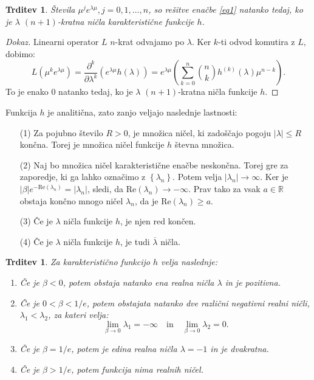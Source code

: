 \documentclass[12pt,a4paper]{amsart}
\theoremstyle{definition} %
\theoremstyle{plain} %
\newtheorem{trditev}[definicija]{Trditev}
\newcommand{\R}{\mathbb R}
\begin{document}
\begin{trditev}
    Števila $\mu^{j}e^{\lambda \mu}, j=0,1,\dots,n$, so rešitve enačbe \eqref{eq1} natanko
    tedaj, ko je $\lambda$ $(n+1)$-kratna ničla karakteristične funkcije $h$.
\end{trditev}

\begin{proof}[Dokaz]
    Linearni operator $L$ $n$-krat odvajamo po $\lambda$. Ker $k$-ti odvod komutira z $L$, dobimo:
    \[L(\mu^{k}e^{\lambda\mu})=\frac{\partial^k}{\partial\lambda^k}(e^{\lambda\mu}h(\lambda))
    =e^{\lambda\mu}\left(\sum_{k=0}^{n}\binom{n}{k}h^{(k)}(\lambda)\mu^{n-k}\right). \]
    To je enako 0 natanko tedaj, ko je $\lambda$ $(n+1)$-kratna ničla funkcije $h$.
\end{proof}

\noindent Funkcija $h$ je analitična, zato zanjo veljajo naslednje lastnosti:
\begin{enumerate}
    \item[(1)] Za pojubno število $R > 0$, je množica ničel, ki zadoščajo pogoju $|\lambda|\leq R$ končna. Torej je
            množica ničel funkcije $h$ števna množica.
    \item[(2)] Naj bo množica ničel karakteristične enačbe neskončna. 
    Torej gre za zaporedje, ki ga lahko označimo z $\left\{\lambda_n\right\}$. Potem velja
    $|\lambda_{n}| \to \infty$. Ker je $|\beta|e^{-\text{Re}(\lambda_{n})}=|\lambda_n|$, sledi, da
    $\text{Re}(\lambda_n) \to -\infty$. Prav tako za vsak $a \in \R$ obstaja končno mnogo ničel $\lambda_n$,
    da je $\text{Re}(\lambda_n) \geq a$. 
    \item[(3)] Če je $\lambda$ ničla funkcije $h$, je njen red končen.
    \item[(4)] Če je $\lambda$ ničla funkcije $h$, je tudi $\overline{\lambda}$ ničla.
\end{enumerate}


\begin{trditev}
    Za karakteristično funkcijo $h$ velja naslednje:
    \begin{enumerate}
        \item Če je $\beta < 0$, potem obstaja natanko ena realna ničla $\lambda$ in je pozitivna.
        \item Če je $0 < \beta < 1/e$, potem obstajata natanko dve različni negativni realni
         ničli, $\lambda_{1} < \lambda_{2}$, za kateri velja:
         \[ \lim_{\beta \to 0}\lambda_{1}=-\infty \quad \text{in} \quad \lim_{\beta \to 0}\lambda_{2}=0. \]
        \item Če je $\beta = 1/e$, potem je edina realna ničla $\lambda = -1$ in je dvakratna.
        \item Če je $\beta > 1/e$, potem funkcija nima realnih ničel.
    \end{enumerate}
\end{trditev}
\end{document}
